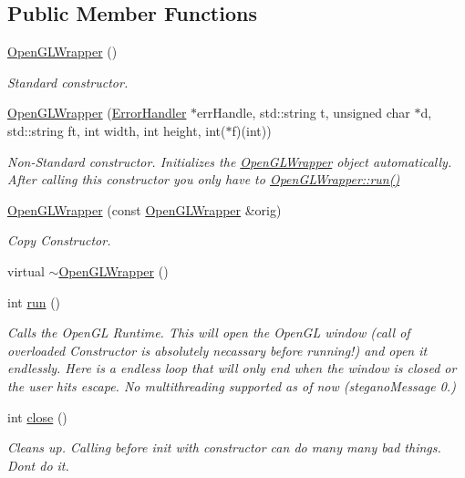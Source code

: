 \subsection*{Public Member Functions}
\begin{DoxyCompactItemize}
\item 
\mbox{\hyperlink{classOpenGLWrapper_a841f4d85a65a5614618a986c395e85a0}{Open\+G\+L\+Wrapper}} ()
\begin{DoxyCompactList}\small\item\em Standard constructor. \end{DoxyCompactList}\item 
\mbox{\hyperlink{classOpenGLWrapper_acb09341d671225fbed6b11ec23aa095f}{Open\+G\+L\+Wrapper}} (\mbox{\hyperlink{classErrorHandler}{Error\+Handler}} $\ast$err\+Handle, std\+::string t, unsigned char $\ast$d, std\+::string ft, int width, int height, int($\ast$f)(int))
\begin{DoxyCompactList}\small\item\em Non-\/\+Standard constructor. Initializes the \mbox{\hyperlink{classOpenGLWrapper}{Open\+G\+L\+Wrapper}} object automatically. After calling this constructor you only have to \mbox{\hyperlink{classOpenGLWrapper_aac166dc029379011ed0a29c8f6d74776}{Open\+G\+L\+Wrapper\+::run()}} \end{DoxyCompactList}\item 
\mbox{\hyperlink{classOpenGLWrapper_a51c0cfb12574c51978de55b3a5c67362}{Open\+G\+L\+Wrapper}} (const \mbox{\hyperlink{classOpenGLWrapper}{Open\+G\+L\+Wrapper}} \&orig)
\begin{DoxyCompactList}\small\item\em Copy Constructor. \end{DoxyCompactList}\item 
virtual \mbox{\hyperlink{classOpenGLWrapper_aeb3efd8a1f2990c48a16ca85e203025e}{$\sim$\+Open\+G\+L\+Wrapper}} ()
\item 
int \mbox{\hyperlink{classOpenGLWrapper_aac166dc029379011ed0a29c8f6d74776}{run}} ()
\begin{DoxyCompactList}\small\item\em Calls the Open\+GL Runtime. This will open the Open\+GL window (call of overloaded Constructor is absolutely necassary before running!) and open it endlessly. Here is a endless loop that will only end when the window is closed or the user hits escape. No multithreading supported as of now (stegano\+Message 0.) \end{DoxyCompactList}\item 
int \mbox{\hyperlink{classOpenGLWrapper_af7418fa6074f3c2044b042edf19326c8}{close}} ()
\begin{DoxyCompactList}\small\item\em Cleans up. Calling before init with constructor can do many many bad things. Dont do it. \end{DoxyCompactList}\end{DoxyCompactItemize}
